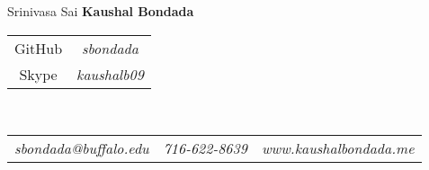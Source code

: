 \documentclass[12pt,a4paper,oneside]{article}
\begin{document}
    \begin{center}
        {\Huge \textmd{Srinivasa Sai} \textbf{Kaushal Bondada}}
        \hspace{2ex}
        \begin{tabular}{cc}
            GitHub&\textit{sbondada}\\
            Skype&\textit{kaushalb09}
        \end{tabular}\\
    \end{center}
    \begin{flushleft}
        \begin{tabular}{c|c|c}
            \textit{sbondada@buffalo.edu}&\textit{716-622-8639}&\textit{www.kaushalbondada.me} 
        \end{tabular} \\
        \hrulefill 
    \end{flushleft}
    \vspace{0pt}
    \begin{minipage}[t]{0.6\textwidth}
        \vspace{0pt}
        \blindtext

        \blindtext


        \blindtext

    \end{minipage}
    \hspace{2ex}
    \begin{minipage}[t]{0.37\textwidth}
        \vspace{0pt}
        \blindtext


        \blindtext


    \end{minipage}
\end{document}
